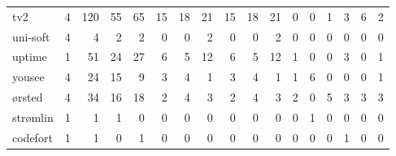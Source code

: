 \begin{tabular}{lrrrrrrrrrrrrrrrr}
tv2 & 4 & 120 & 55 & 65 & 15 & 18 & 21 & 15 & 18 & 21 & 0 & 0 & 1 & 3 & 6 & 2 \\
uni-soft & 4 & 4 & 2 & 2 & 0 & 0 & 2 & 0 & 0 & 2 & 0 & 0 & 0 & 0 & 0 & 0 \\
uptime & 1 & 51 & 24 & 27 & 6 & 5 & 12 & 6 & 5 & 12 & 1 & 0 & 0 & 3 & 0 & 1 \\
yousee & 4 & 24 & 15 & 9 & 3 & 4 & 1 & 3 & 4 & 1 & 1 & 6 & 0 & 0 & 0 & 1 \\
ørsted & 4 & 34 & 16 & 18 & 2 & 4 & 3 & 2 & 4 & 3 & 2 & 0 & 5 & 3 & 3 & 3 \\
strømlin & 1 & 1 & 1 & 0 & 0 & 0 & 0 & 0 & 0 & 0 & 0 & 1 & 0 & 0 & 0 & 0 \\
codefort & 1 & 1 & 0 & 1 & 0 & 0 & 0 & 0 & 0 & 0 & 0 & 0 & 0 & 1 & 0 & 0 \\
\bottomrule
\end{tabular}
